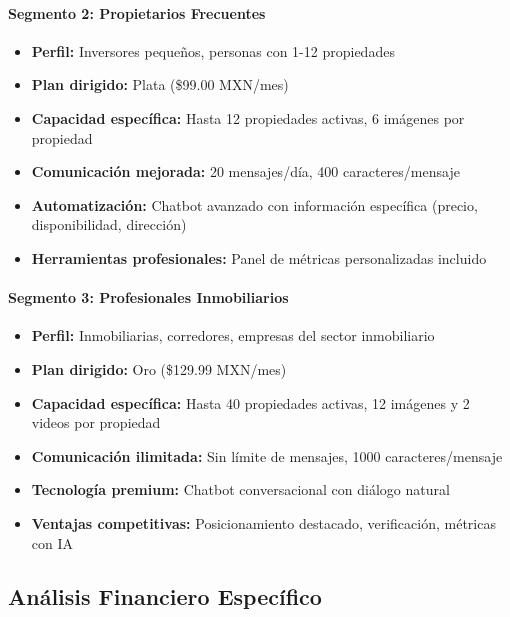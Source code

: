 		\paragraph{Segmento 2: Propietarios Frecuentes}
		\begin{itemize}
			\item \textbf{Perfil:} Inversores pequeños, personas con 1-12 propiedades
			\item \textbf{Plan dirigido:} Plata (\$99.00 MXN/mes)
			\item \textbf{Capacidad específica:} Hasta 12 propiedades activas, 6 imágenes por propiedad
			\item \textbf{Comunicación mejorada:} 20 mensajes/día, 400 caracteres/mensaje
			\item \textbf{Automatización:} Chatbot avanzado con información específica (precio, disponibilidad, dirección)
			\item \textbf{Herramientas profesionales:} Panel de métricas personalizadas incluido
		\end{itemize}
		
		\paragraph{Segmento 3: Profesionales Inmobiliarios}
		\begin{itemize}
			\item \textbf{Perfil:} Inmobiliarias, corredores, empresas del sector inmobiliario
			\item \textbf{Plan dirigido:} Oro (\$129.99 MXN/mes)
			\item \textbf{Capacidad específica:} Hasta 40 propiedades activas, 12 imágenes y 2 videos por propiedad
			\item \textbf{Comunicación ilimitada:} Sin límite de mensajes, 1000 caracteres/mensaje
			\item \textbf{Tecnología premium:} Chatbot conversacional con diálogo natural
			\item \textbf{Ventajas competitivas:} Posicionamiento destacado, verificación, métricas con IA
		\end{itemize}
		
		\subsection{Análisis Financiero Específico}
